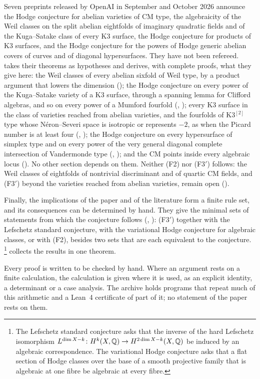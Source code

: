 Seven preprints released by OpenAI in September and October 2026
\cite{OAI26a,OAI26b,OAI26c,OAI26d,OAI26e,OAI26f,OAI26g} announce the Hodge
conjecture for abelian varieties of CM type, the algebraicity of the Weil
classes on the split abelian eightfolds of imaginary quadratic fields and of
the Kuga--Satake class of every K3 surface, the Hodge conjecture for products
of K3 surfaces, and the Hodge conjecture for the powers of Hodge generic
abelian covers of curves and of diagonal hypersurfaces. They have not been
refereed.  takes their theorems as hypotheses and
derives, with complete proofs, what they give here: the Weil classes of every
abelian sixfold of Weil type, by a product argument that lowers the dimension
(); the Hodge conjecture on every power of the
Kuga--Satake variety of a K3 surface, through a spanning lemma for Clifford
algebras, and so on every power of a Mumford fourfold (,
); every K3 surface in the class of varieties reached
from abelian varieties, and the
fourfolds of K3$^{[2]}$ type whose N\'eron--Severi space is isotropic or
represents $-2$, as when the Picard number is at least four
(, ); the Hodge conjecture
on every hypersurface of simplex type and on every power of the very general
diagonal complete intersection of Vandermonde type (,
); and the CM points inside every algebraic locus
(). No other section depends on them. Neither (F2) nor
(F3$'$) follows: the Weil classes of eightfolds of nontrivial discriminant
and of quartic CM fields, and (F3$'$) beyond the varieties reached from
abelian varieties, remain open ().

Finally, the implications of the paper and of the literature form a finite
rule set, and its consequences can be determined by hand. They give the
minimal sets of statements from which the conjecture follows
(, ): (F3$'$) together with the Lefschetz standard
conjecture, with the variational Hodge conjecture for algebraic classes, or
with (F2), besides two sets that are each equivalent to the conjecture.%
\footnote{The Lefschetz standard conjecture asks that the inverse of the
hard Lefschetz isomorphism $L^{\dim X-k}\colon H^{k}(X,\mathbb{Q})\to
H^{2\dim X-k}(X,\mathbb{Q})$ be induced by an algebraic correspondence. The
variational Hodge conjecture asks that a flat section of Hodge classes over
the base of a smooth projective family that is algebraic at one fibre be
algebraic at every fibre.}
 collects the results in one theorem.

Every proof is written to be checked by hand. Where an argument rests on a
finite calculation, the calculation is given where it is used, as an explicit
identity, a determinant or a case analysis. The archive \cite{Bha26} holds
programs that repeat much of this arithmetic and a Lean~4 certificate of part
of it; no statement of the paper rests on them.
